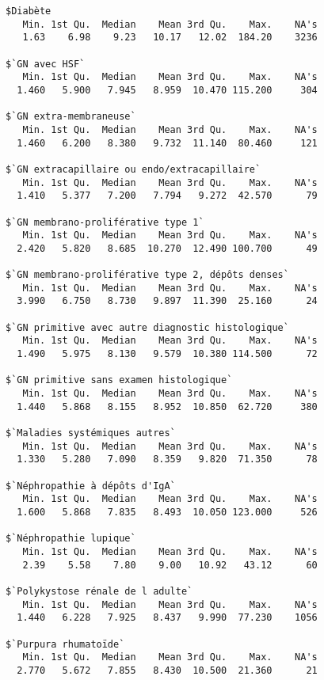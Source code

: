 \documentclass[11pt,a4paper]{article}\usepackage[]{graphicx}\usepackage[]{color}
\makeatletter
\newenvironment{kframe}{%
 \def\at@end@of@kframe{}%
 \ifinner\ifhmode%
  \def\at@end@of@kframe{\end{minipage}}%
  \begin{minipage}{\columnwidth}%
 \fi\fi%
 \def\FrameCommand##1{\hskip\@totalleftmargin \hskip-\fboxsep
 \colorbox{shadecolor}{##1}\hskip-\fboxsep
     \hskip-\linewidth \hskip-\@totalleftmargin \hskip\columnwidth}%
 \MakeFramed {\advance\hsize-\width
   \@totalleftmargin\z@ \linewidth\hsize
   \@setminipage}}%
 {\par\unskip\endMakeFramed%
 \at@end@of@kframe}
\newenvironment{knitrout}{}{} %
\makeatother
\begin{document}
\begin{knitrout}
\color{fgcolor}\begin{kframe}
\begin{verbatim}
$Diabète
   Min. 1st Qu.  Median    Mean 3rd Qu.    Max.    NA's 
   1.63    6.98    9.23   10.17   12.02  184.20    3236 

$`GN avec HSF`
   Min. 1st Qu.  Median    Mean 3rd Qu.    Max.    NA's 
  1.460   5.900   7.945   8.959  10.470 115.200     304 

$`GN extra-membraneuse`
   Min. 1st Qu.  Median    Mean 3rd Qu.    Max.    NA's 
  1.460   6.200   8.380   9.732  11.140  80.460     121 

$`GN extracapillaire ou endo/extracapillaire`
   Min. 1st Qu.  Median    Mean 3rd Qu.    Max.    NA's 
  1.410   5.377   7.200   7.794   9.272  42.570      79 

$`GN membrano-proliférative type 1`
   Min. 1st Qu.  Median    Mean 3rd Qu.    Max.    NA's 
  2.420   5.820   8.685  10.270  12.490 100.700      49 

$`GN membrano-proliférative type 2, dépôts denses`
   Min. 1st Qu.  Median    Mean 3rd Qu.    Max.    NA's 
  3.990   6.750   8.730   9.897  11.390  25.160      24 

$`GN primitive avec autre diagnostic histologique`
   Min. 1st Qu.  Median    Mean 3rd Qu.    Max.    NA's 
  1.490   5.975   8.130   9.579  10.380 114.500      72 

$`GN primitive sans examen histologique`
   Min. 1st Qu.  Median    Mean 3rd Qu.    Max.    NA's 
  1.440   5.868   8.155   8.952  10.850  62.720     380 

$`Maladies systémiques autres`
   Min. 1st Qu.  Median    Mean 3rd Qu.    Max.    NA's 
  1.330   5.280   7.090   8.359   9.820  71.350      78 

$`Néphropathie à dépôts d'IgA`
   Min. 1st Qu.  Median    Mean 3rd Qu.    Max.    NA's 
  1.600   5.868   7.835   8.493  10.050 123.000     526 

$`Néphropathie lupique`
   Min. 1st Qu.  Median    Mean 3rd Qu.    Max.    NA's 
   2.39    5.58    7.80    9.00   10.92   43.12      60 

$`Polykystose rénale de l adulte`
   Min. 1st Qu.  Median    Mean 3rd Qu.    Max.    NA's 
  1.440   6.228   7.925   8.437   9.990  77.230    1056 

$`Purpura rhumatoïde`
   Min. 1st Qu.  Median    Mean 3rd Qu.    Max.    NA's 
  2.770   5.672   7.855   8.430  10.500  21.360      21 
\end{verbatim}
\end{kframe}
\end{knitrout}
\end{document}
